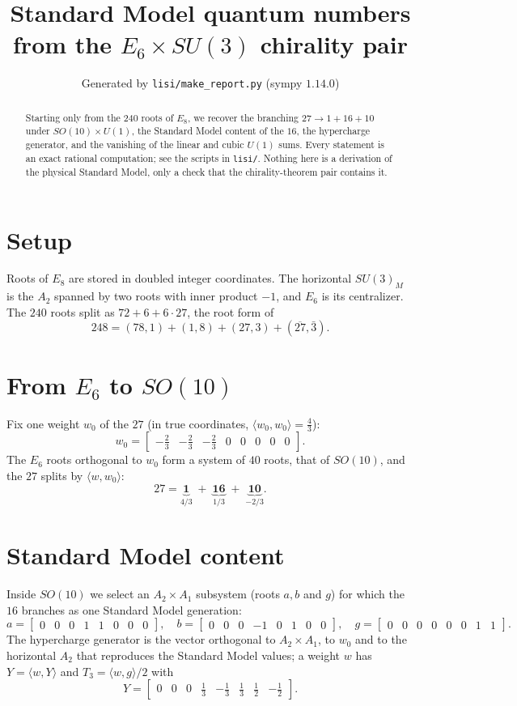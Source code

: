 \documentclass[11pt]{article}
\title{Standard Model quantum numbers from the $E_6\times SU(3)$ chirality pair}
\author{Generated by \texttt{lisi/make\_report.py} (sympy $1.14.0$)}
\date{}
\begin{document}
\maketitle

\begin{abstract}
Starting only from the 240 roots of $E_8$, we recover the branching
$27\to 1+16+10$ under $SO(10)\times U(1)$, the Standard Model content of the
$16$, the hypercharge generator, and the vanishing of the linear and cubic
$U(1)$ sums.  Every statement is an exact rational computation; see the
scripts in \texttt{lisi/}.  Nothing here is a derivation of the physical
Standard Model, only a check that the chirality-theorem pair contains it.
\end{abstract}

\section{Setup}
Roots of $E_8$ are stored in doubled integer coordinates.  The horizontal
$SU(3)_M$ is the $A_2$ spanned by two roots with inner product $-1$, and
$E_6$ is its centralizer.  The $240$ roots split as $72+6+6\cdot27$, the root
form of
\[
  248=(78,1)+(1,8)+(27,3)+(\overline{27},\bar 3).
\]

\section{From $E_6$ to $SO(10)$}
Fix one weight $w_0$ of the $27$ (in true coordinates, $\langle w_0,w_0\rangle=\frac{4}{3}$):
\[
  w_0=\left[\begin{matrix}- \frac{2}{3} & - \frac{2}{3} & - \frac{2}{3} & 0 & 0 & 0 & 0 & 0\end{matrix}\right] .
\]
The $E_6$ roots orthogonal to $w_0$ form a system of $40$ roots, that of
$SO(10)$, and the $27$ splits by $\langle w,w_0\rangle$:
\[
  27 = \underbrace{\mathbf{1}}_{4/3}\;+\;\underbrace{\mathbf{16}}_{1/3}\;+\;\underbrace{\mathbf{10}}_{-2/3}.
\]

\section{Standard Model content}
Inside $SO(10)$ we select an $A_2\times A_1$ subsystem (roots $a,b$ and $g$)
for which the $16$ branches as one Standard Model generation:
\[
  a=\left[\begin{matrix}0 & 0 & 0 & 1 & 1 & 0 & 0 & 0\end{matrix}\right],\quad b=\left[\begin{matrix}0 & 0 & 0 & -1 & 0 & 1 & 0 & 0\end{matrix}\right],\quad g=\left[\begin{matrix}0 & 0 & 0 & 0 & 0 & 0 & 1 & 1\end{matrix}\right] .
\]
The hypercharge generator is the vector orthogonal to $A_2\times A_1$, to
$w_0$ and to the horizontal $A_2$ that reproduces the Standard Model
values; a weight $w$ has $Y=\langle w,Y\rangle$ and $T_3=\langle w,g\rangle/2$ with
\[
  Y=\left[\begin{matrix}0 & 0 & 0 & \frac{1}{3} & - \frac{1}{3} & \frac{1}{3} & \frac{1}{2} & - \frac{1}{2}\end{matrix}\right] .
\]
\end{document}
